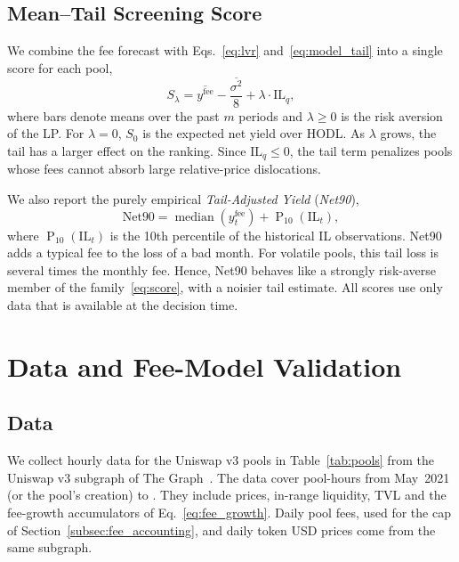 \documentclass[10pt,conference,compsocconf]{IEEEtran}
\begin{document}
\subsection{Mean--Tail Screening Score}
\label{subsec:net90}
We combine the fee forecast with Eqs.~\eqref{eq:lvr} and~\eqref{eq:model_tail} into a single score for each pool,
\begin{equation}
\label{eq:score}
S_\lambda = \overline{y^{\mathrm{fee}}} - \frac{\overline{\sigma^2}}{8} + \lambda\cdot\mathrm{IL}_q,
\end{equation}
where bars denote means over the past $m$ periods and $\lambda\ge 0$ is the risk aversion of the LP. For $\lambda=0$, $S_0$ is the expected net yield over HODL. As $\lambda$ grows, the tail has a larger effect on the ranking. Since $\mathrm{IL}_q\le0$, the tail term penalizes pools whose fees cannot absorb large relative-price dislocations.

We also report the purely empirical \emph{Tail-Adjusted Yield} (\emph{Net90}),
\begin{equation}
\label{eq:net90}
\mathrm{Net90}
=
\operatorname{median}\!\left(y^{\text{fee}}_{t}\right)
+
\operatorname{P}_{10}\!\left(\mathrm{IL}_{t}\right),
\end{equation}
where $\operatorname{P}_{10}(\mathrm{IL}_t)$ is the 10th percentile of the historical IL observations. Net90 adds a typical fee to the loss of a bad month. For volatile pools, this tail loss is several times the monthly fee. Hence, Net90 behaves like a strongly risk-averse member of the family~\eqref{eq:score}, with a noisier tail estimate. All scores use only data that is available at the decision time.


\section{Data and Fee-Model Validation}
\label{sec:empirical_analysis}

\subsection{Data}

\begin{table}[t]
\centering
\scriptsize
\setlength{\tabcolsep}{2pt}

\caption{The \NPools{} Uniswap v3 pools on Ethereum, from \NFamilies{} pairs.}
\label{tab:pools}
\end{table}

We collect hourly data for the \NPools{} Uniswap v3 pools in Table~\ref{tab:pools} from the Uniswap v3 subgraph of The Graph~\cite{thegraph_uniswap}. The data cover \NHours{} pool-hours from May~2021 (or the pool's creation) to \DataEnd{}. They include prices, in-range liquidity, TVL and the fee-growth accumulators of Eq.~\eqref{eq:fee_growth}. Daily pool fees, used for the cap of Section~\ref{subsec:fee_accounting}, and daily token USD prices come from the same subgraph.
\end{document}
